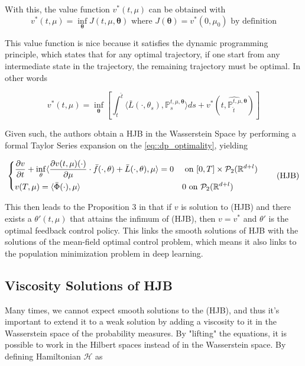 With this, the value function $v^*(t,\mu)$ can be obtained with
\begin{equation*}
    v^*(t,\mu) = \inf_{\bm{\theta}} J(t,\mu,\bm{\theta}) \text{ where } J(\bm{\theta}) = v^*(0,\mu_0) \text{ by definition}
\end{equation*}

This value function is nice because it satisfies the dynamic programming principle, which states that for any optimal trajectory, if one start from any intermediate state in the trajectory, the remaining trajectory must be optimal. In other words

\begin{equation*} \label{eq::dp_optimality}
    v^*(t,\mu) = \inf_{\bm{\theta}} \left[ \int_t^{\hat{t}}  \langle \bar{L}(\cdot,\theta_s), \mathbb{P}_s^{t,\mu,\bm{\theta}} \rangle ds + v^* (\hat{t,\mathbb{P}_{\hat{t}}^{t,\mu,\bm{\theta}}}) \right]
\end{equation*}

Given such, the authors obtain a HJB in the Wasserstein Space by performing a formal Taylor Series expansion on the \ref{eq::dp_optimality}, yielding

\begin{equation}
    \begin{dcases}
        \frac{\partial v}{\partial t} + \inf_\theta \langle \frac{\partial v(t,\mu) (\cdot)}{\partial \mu} \cdot \bar{f}(\cdot,\theta) + \bar{L}(\cdot,\theta) , \mu \rangle = 0 & \text{ on } [0,T] \times \mathcal{P}_2(\mathbb{R}^{d+l}) \\
        v(T,\mu) = \langle \bar{\Phi}(\cdot),\mu \rangle & 0  \text{ on }  \mathcal{P}_2(\mathbb{R}^{d+l})
    \end{dcases}
    \tag{HJB}
\end{equation}

This then leads to the Proposition 3 in \cite{meanfield} that if $v$ is solution to (HJB) and there exists a $\theta'(t,\mu)$ that attains the infimum of (HJB), then $v=v^*$ and $\theta'$ is the optimal feedback control policy. This links the smooth solutions of HJB with the solutions of the mean-field optimal control problem, which means it also links to the population minimization problem in deep learning.

\subsection{Viscosity Solutions of HJB}
Many times, we cannot expect smooth solutions to the (HJB), and thus it's important to extend it to a weak solution by adding a viscosity to it in the Wasserstein space of the probability measures. By "lifting" the equations, it is possible to work in the Hilbert spaces instead of in the Wasserstein space. By defining Hamiltonian $\mathcal{H}$ as

